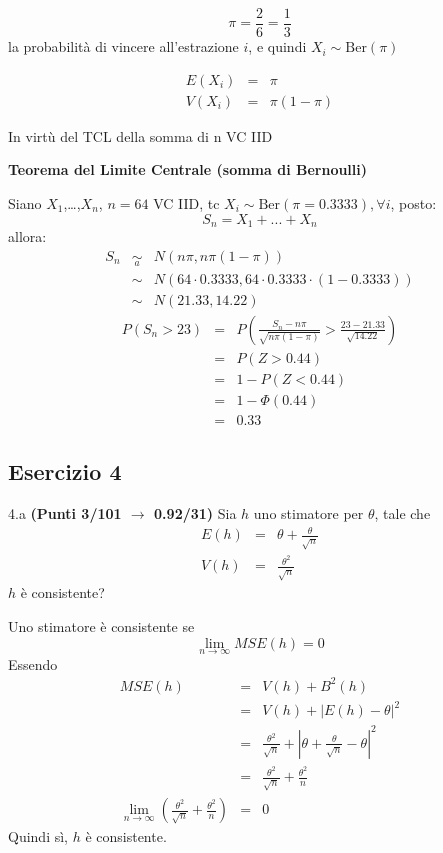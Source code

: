 \documentclass[
  11pt,
]{book}
\theoremstyle{mytheoremstyle}
\theoremstyle{mydefstyle}
\newenvironment{sol}
  {
  \begin{tcolorbox}[enhanced,breakable,arc=0.1mm,boxrule=1pt,colback=white,colframe=iblue,
  title=\bf \fontfamily{lmss}\selectfont \hspace{.5 cm} Soluzione,drop fuzzy shadow]

}{
\end{tcolorbox}
  }
\begin{document}
\begin{sol}
\[
\pi=\frac 2 6=\frac 13
\]
la probabilità di vincere all'estrazione \(i\), e quindi \(X_i\sim\text{Ber}(\pi)\)

\begin{eqnarray*}
E(X_i)&=&\pi\\
V(X_i)&=&\pi(1-\pi)
\end{eqnarray*}

In virtù del TCL della somma di n VC IID

\textbf{Teorema del Limite Centrale (somma di Bernoulli)}

Siano \(X_1\),\ldots,\(X_n\), \(n=64\) VC IID, tc \(X_i\sim\text{Ber}(\pi=0.3333)\)\(,\forall i\), posto:
\[
      S_n = X_1 + ... + X_n
      \]
allora:\begin{eqnarray*}
  S_n & \mathop{\sim}\limits_{a}& N(n\pi,n\pi(1-\pi)) \\
      &\sim & N(64\cdot0.3333,64\cdot0.3333\cdot(1-0.3333)) \\
      &\sim & N(21.33,14.22)
  \end{eqnarray*}\begin{eqnarray*}
      P( S_n   >   23 ) 
        &=& P\left(  \frac { S_n  -  n\pi }{ \sqrt{n\pi(1-\pi)} }  >  \frac { 23  -  21.33 }{\sqrt{ 14.22 }} \right)  \\
                 &=& P\left(  Z   >   0.44 \right) \\    &=& 1-P(Z< 0.44 )\\ 
                 &=&  1-\Phi( 0.44 ) \\ &=&  0.33 
      \end{eqnarray*}

\end{sol}

\subsection{Esercizio 4}\label{esercizio-4-5}

4.a \textbf{(Punti 3/101 \(\rightarrow\) 0.92/31)} Sia \(h\) uno stimatore per \(\theta\), tale che
\begin{eqnarray*}
E(h)&=&\theta+\frac\theta {\sqrt{ n}}\\
V(h)&=&\frac{\theta^2}{\sqrt n}
\end{eqnarray*}
\(h\) è consistente?

\begin{sol}
Uno stimatore è consistente se
\[
\lim_{n\to\infty} MSE(h)=0
\]
Essendo
\begin{eqnarray*}
MSE(h)&=&V(h)+B^2(h)\\
&=&V(h)+|E(h)-\theta|^2\\
&=&\frac{\theta^2}{\sqrt n}+\left|\theta+\frac\theta {\sqrt{ n}}-\theta\right|^2\\
&=&\frac{\theta^2}{\sqrt n}+\frac{\theta^2} { n}\\
\lim_{n\to\infty} \left(\frac{\theta^2}{\sqrt n}+\frac{\theta^2} { n}\right)&=&0
\end{eqnarray*}
Quindi sì, \(h\) è consistente.

\end{sol}
\end{document}
